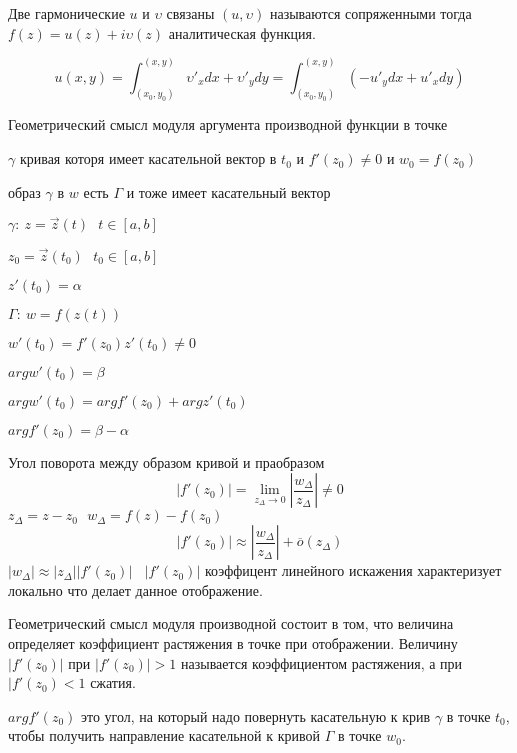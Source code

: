 \begin{define}
  Две гармонические $u$ и $\upsilon$ связаны $(u, \upsilon)$ называются
  сопряженными тогда $f(z) = u(z) + i \upsilon(z)$ аналитическая функция.
\end{define}

$$
u(x,y) = \int_{(x_0, y_0)}^{(x,y)} \upsilon'_x dx + \upsilon'_y dy =
\int_{(x_0, y_0)}^{(x,y)} (-u'_y dx + u'_x dy)
$$

\begin{title}[\Large]
  Геометрический смысл модуля аргумента производной функции в точке
\end{title}

\begin{theorem}
  $\gamma$ кривая которя имеет касательной вектор в $t_0$ и $f'(z_0) \not = 0$
  и $w_0 = f(z_0)$

  образ $\gamma$ в $w$ есть $\Gamma$ и тоже имеет касательный вектор

  $\gamma: ~ z = \vec z(t) ~~~ t \in [a,b]$

  $z_0 = \vec z(t_0) ~~~ t_0 \in [a,b]$

  $z'(t_0) = \alpha$

  $\Gamma: ~ w = f(z(t))$

  $w'(t_0) = f'(z_0)z'(t_0) \not = 0$

  $arg w'(t_0) = \beta$

  $arg w'(t_0) = arg f'(z_0) + arg z'(t_0)$

  $arg f'(z_0) = \beta - \alpha$

  Угол поворота между образом кривой и праобразом
  $$
  |f'(z_0)| = \lim_{z_{\Delta} \to 0} \left| \frac{w_{\Delta}}{z_{\Delta}}
  \right| \not = 0
  $$
  $z_{\Delta} = z - z_0 ~~~ w_{\Delta} = f(z) - f(z_0)$
  $$
  |f'(z_0)| \approx \left| \frac{w_{\Delta}}{z_{\Delta}} \right| +
  \overline{o}(z_{\Delta})
  $$
  $|w_{\Delta}| \approx |z_{\Delta}| |f'(z_0)| ~~~~ |f'(z_0)|$ коэффицент
  линейного искажения характеризует локально что делает данное отображение.

  Геометрический смысл модуля производной состоит в том, что величина
  определяет коэффициент растяжения в точке при отображении. Величину
  $|f'(z_0)|$ при $|f'(z_0)| > 1$ называется коэффициентом растяжения,
  а при $|f'(z_0) < 1$ сжатия.

  $arg f'(z_0)$ это угол, на который надо повернуть касательную к крив $\gamma$
  в точке $t_0$, чтобы получить направление касательной к кривой $\Gamma$ в
  точке $w_0$.
\end{theorem}
